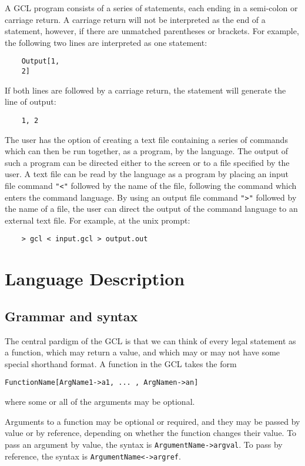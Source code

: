 A GCL program consists of a series of statements, each ending in a
semi-colon or carriage return. A carriage return will not be
interpreted as the end of a statement, however, if there are unmatched
parentheses or brackets.  For example, the following two lines are
interpreted as one statement:

\begin{verbatim}
	Output[1, 
	2]
\end{verbatim}

If both lines are followed by a carriage return, the statement will
generate the line of output:

\begin{verbatim}
	1, 2
\end{verbatim}

The user has the option of creating a text file containing a series of
commands which can then be run together, as a program, by the
language.  The output of such a program can be directed either to the
screen or to a file specified by the user.  A text file can be read by
the language as a program by placing an input file command {\tt "<"}
followed by the name of the file, following the command which enters
the command language.  By using an output file command {\tt ">"}
followed by the name of a file, the user can direct the output of the
command language to an external text file.  For example, at the unix prompt:

\begin{verbatim}
	> gcl < input.gcl > output.out
\end{verbatim}

\section{Language Description}

\subsection{Grammar and syntax}

The central pardigm of the GCL is that we can think of every legal
statement as a function, which may return a value, and which may or may
not have some special shorthand format.  A function in the GCL takes the
form 
\begin{verbatim}
FunctionName[ArgName1->a1, ... , ArgNamen->an]
\end{verbatim}
where some or all of the arguments may be optional.  

Arguments to a function may be optional or required, and they may be
passed by value or by reference, depending on whether the function
changes their value.  To pass an argument by value, the syntax is
\verb+ArgumentName->argval+.  To pass by reference, the syntax is
\verb+ArgumentName<->argref+.  

